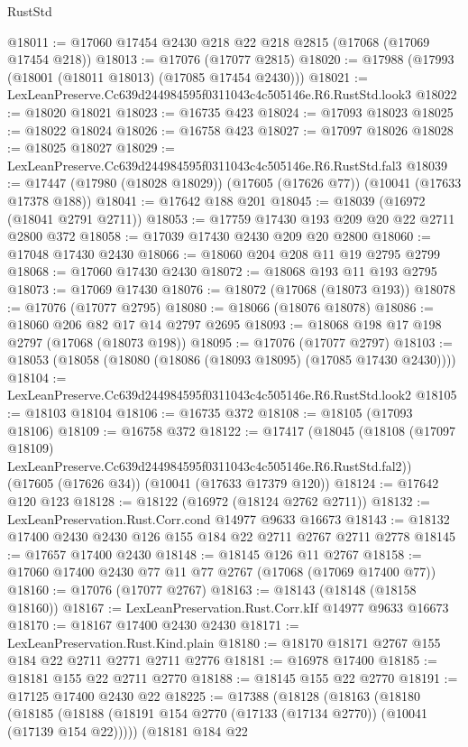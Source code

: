 \begin{lexlean}{RustStd}
\begin{coremodule}
@18011 := @17060 @17454 @2430 @218 @22 @218 @2815 (@17068 (@17069 @17454 @218))
@18013 := @17076 (@17077 @2815)
@18020 := @17988 (@17993 (@18001 (@18011 @18013) (@17085 @17454 @2430)))
@18021 := LexLeanPreserve.Cc639d244984595f0311043c4c505146e.R6.RustStd.look3
@18022 := @18020 @18021
@18023 := @16735 @423
@18024 := @17093 @18023
@18025 := @18022 @18024
@18026 := @16758 @423
@18027 := @17097 @18026
@18028 := @18025 @18027
@18029 := LexLeanPreserve.Cc639d244984595f0311043c4c505146e.R6.RustStd.fal3
@18039 := @17447 (@17980 (@18028 @18029)) (@17605 (@17626 @77)) (@10041 (@17633 @17378 @188))
@18041 := @17642 @188 @201
@18045 := @18039 (@16972 (@18041 @2791 @2711))
@18053 := @17759 @17430 @193 @209 @20 @22 @2711 @2800 @372
@18058 := @17039 @17430 @2430 @209 @20 @2800
@18060 := @17048 @17430 @2430
@18066 := @18060 @204 @208 @11 @19 @2795 @2799
@18068 := @17060 @17430 @2430
@18072 := @18068 @193 @11 @193 @2795
@18073 := @17069 @17430
@18076 := @18072 (@17068 (@18073 @193))
@18078 := @17076 (@17077 @2795)
@18080 := @18066 (@18076 @18078)
@18086 := @18060 @206 @82 @17 @14 @2797 @2695
@18093 := @18068 @198 @17 @198 @2797 (@17068 (@18073 @198))
@18095 := @17076 (@17077 @2797)
@18103 := @18053 (@18058 (@18080 (@18086 (@18093 @18095) (@17085 @17430 @2430))))
@18104 := LexLeanPreserve.Cc639d244984595f0311043c4c505146e.R6.RustStd.look2
@18105 := @18103 @18104
@18106 := @16735 @372
@18108 := @18105 (@17093 @18106)
@18109 := @16758 @372
@18122 := @17417
    (@18045
      (@18108 (@17097 @18109) LexLeanPreserve.Cc639d244984595f0311043c4c505146e.R6.RustStd.fal2))
    (@17605 (@17626 @34))
    (@10041 (@17633 @17379 @120))
@18124 := @17642 @120 @123
@18128 := @18122 (@16972 (@18124 @2762 @2711))
@18132 := LexLeanPreservation.Rust.Corr.cond @14977 @9633 @16673
@18143 := @18132 @17400 @2430 @2430 @126 @155 @184 @22 @2711 @2767 @2711 @2778
@18145 := @17657 @17400 @2430
@18148 := @18145 @126 @11 @2767
@18158 := @17060 @17400 @2430 @77 @11 @77 @2767 (@17068 (@17069 @17400 @77))
@18160 := @17076 (@17077 @2767)
@18163 := @18143 (@18148 (@18158 @18160))
@18167 := LexLeanPreservation.Rust.Corr.kIf @14977 @9633 @16673
@18170 := @18167 @17400 @2430 @2430
@18171 := LexLeanPreservation.Rust.Kind.plain
@18180 := @18170 @18171 @2767 @155 @184 @22 @2711 @2771 @2711 @2776
@18181 := @16978 @17400
@18185 := @18181 @155 @22 @2711 @2770
@18188 := @18145 @155 @22 @2770
@18191 := @17125 @17400 @2430 @22
@18225 := @17388
    (@18128
      (@18163
        (@18180
          (@18185 (@18188 (@18191 @154 @2770 (@17133 (@17134 @2770)) (@10041 (@17139 @154 @22)))))
          (@18181
            @184
            @22

\end{coremodule}
\end{lexlean}
